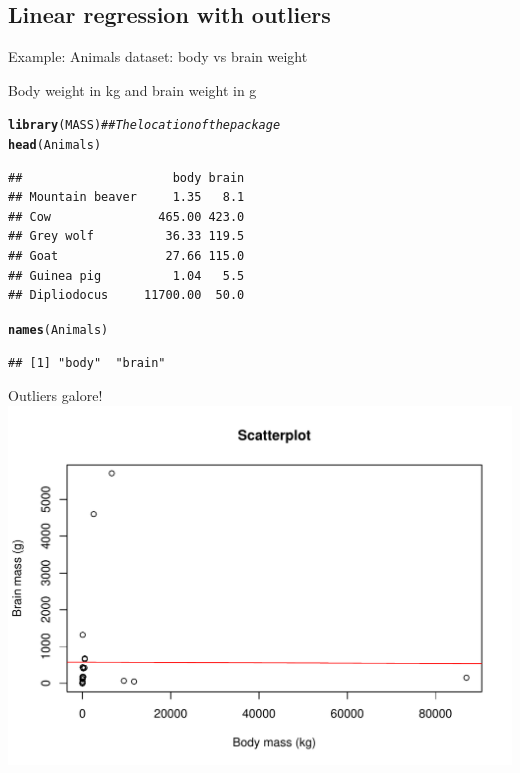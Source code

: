 \documentclass[t,xcolor=pdftex,dvipsnames,table]{beamer}
\makeatletter
\def\maxwidth{ %
  \ifdim\Gin@nat@width>\linewidth
    \linewidth
  \else
    \Gin@nat@width
  \fi
}
\newcommand{\hlcom}[1]{\textcolor[rgb]{0.678,0.584,0.686}{\textit{#1}}}%
\newcommand{\hlstd}[1]{\textcolor[rgb]{0.345,0.345,0.345}{#1}}%
\newcommand{\hlkwd}[1]{\textcolor[rgb]{0.737,0.353,0.396}{\textbf{#1}}}%
\newenvironment{kframe}{%
 \def\at@end@of@kframe{}%
 \ifinner\ifhmode%
  \def\at@end@of@kframe{\end{minipage}}%
  \begin{minipage}{\columnwidth}%
 \fi\fi%
 \def\FrameCommand##1{\hskip\@totalleftmargin \hskip-\fboxsep
 \colorbox{shadecolor}{##1}\hskip-\fboxsep
     \hskip-\linewidth \hskip-\@totalleftmargin \hskip\columnwidth}%
 \MakeFramed {\advance\hsize-\width
   \@totalleftmargin\z@ \linewidth\hsize
   \@setminipage}}%
 {\par\unskip\endMakeFramed%
 \at@end@of@kframe}
\newenvironment{knitrout}{}{} %
\makeatother
\begin{document}
\subsection{Linear regression with outliers}
\begin{frame}[fragile]{Example: Animals dataset: body vs brain weight}

Body weight in kg and brain weight in g

\begin{knitrout}
\color{fgcolor}\begin{kframe}
\begin{alltt}
\hlkwd{library}\hlstd{(MASS)} \hlcom{## The location of the package}
\hlkwd{head}\hlstd{(Animals)}
\end{alltt}
\begin{verbatim}
##                     body brain
## Mountain beaver     1.35   8.1
## Cow               465.00 423.0
## Grey wolf          36.33 119.5
## Goat               27.66 115.0
## Guinea pig          1.04   5.5
## Dipliodocus     11700.00  50.0
\end{verbatim}
\begin{alltt}
\hlkwd{names}\hlstd{(Animals)}
\end{alltt}
\begin{verbatim}
## [1] "body"  "brain"
\end{verbatim}
\end{kframe}
\end{knitrout}


\end{frame}

\begin{frame}[fragile]{Outliers galore!}
\begin{knitrout}
\color{fgcolor}
\includegraphics[width=\maxwidth]{figure/unnamed-chunk-15-1} 

\end{knitrout}
\end{frame}
\end{document}
